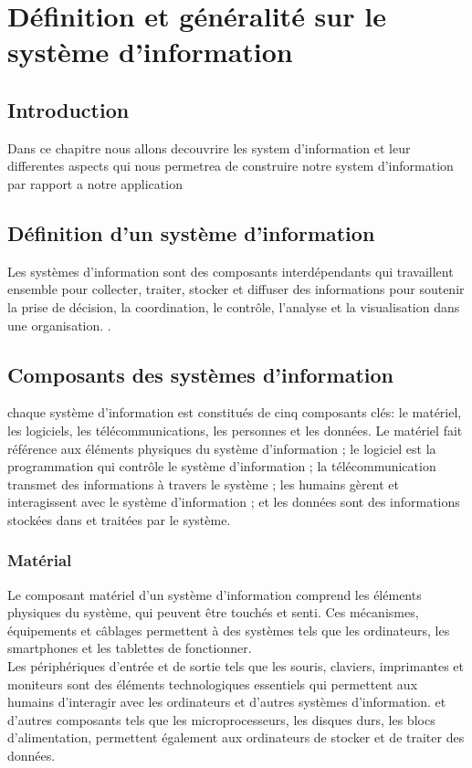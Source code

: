 \chapter{Définition et généralité sur le système d'information }
\section{Introduction }

\par Dans ce chapitre nous allons decouvrire les system d'information et leur
differentes aspects qui nous permetrea de construire notre system d'information
par rapport a notre application


\section{Définition d'un système d'information }
\par Les systèmes d'information sont des composants interdépendants qui
travaillent ensemble pour collecter, traiter, stocker et diffuser des
informations pour soutenir la prise de décision, la coordination, le contrôle,
l'analyse et la visualisation dans une organisation.
\cite{ref1}.

\section{Composants des systèmes d'information }
\par chaque système d'information est constitués de cinq composants clés: le
matériel, les logiciels, les télécommunications, les personnes et les données.
Le matériel fait référence aux éléments physiques du système d'information ; le
logiciel est la programmation qui contrôle le système d'information ; la
télécommunication transmet des informations à travers le système ; les humains
gèrent et interagissent avec le système d'information ; et les données sont des
informations stockées dans et traitées par le système.

\subsection{Matérial }
\par Le composant matériel d'un système d'information comprend les éléments
physiques du système, qui peuvent être touchés et senti. Ces mécanismes,
équipements et câblages permettent à des systèmes tels que les ordinateurs, les
smartphones et les tablettes de fonctionner.\\
Les périphériques d'entrée et de sortie tels que les souris, claviers,
imprimantes et moniteurs sont des éléments technologiques essentiels qui
permettent aux humains d'interagir avec les ordinateurs et d'autres systèmes
d'information. et d’autres composants tels que les microprocesseurs, les
disques durs, les blocs d'alimentation, permettent également aux ordinateurs de
stocker et de traiter des données.

